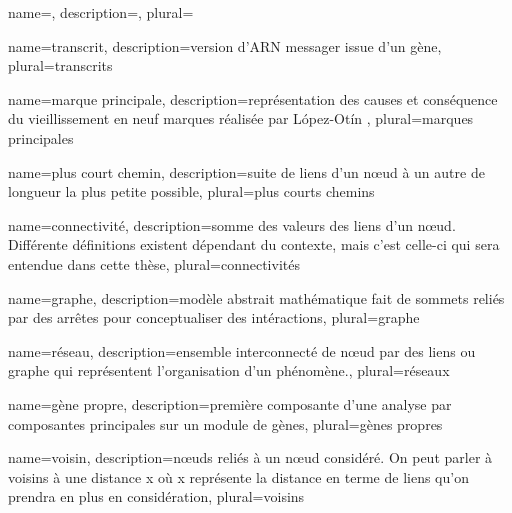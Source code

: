 
\printglossary[nonumberlist]
\glsaddall






\newglossaryentry{}
{
	name={},
	description={}, 
	plural={}
}

{
	name={transcrit},
	description={version d'ARN messager issue d'un gène}, 
	plural={transcrits}
}

{
	name={marque principale},
	description={représentation des causes et conséquence du vieillissement en neuf marques réalisée par López-Otín \cite{Lopez-Otin2013}}, 
	plural={marques principales}
}

{
	name={plus court chemin},
	description={suite de liens d'un nœud à un autre de longueur la plus petite possible}, 
	plural={plus courts chemins}
}

{
	name={connectivité},
	description={somme des valeurs des liens d'un nœud. Différente définitions existent dépendant du contexte, mais c'est celle-ci qui sera entendue dans cette thèse}, 
	plural={connectivités}
}

{
	name={graphe},
	description={modèle abstrait mathématique fait de sommets reliés par des arrêtes pour conceptualiser des intéractions}, 
	plural={graphe}
}

{
	name={réseau},
	description={ensemble interconnecté de nœud par des liens ou graphe qui représentent l'organisation d'un phénomène.}, 
	plural={réseaux}
}

{
	name={gène propre},
	description={première composante d'une analyse par composantes principales sur un module de gènes}, 
	plural={gènes propres}
}

{
	name={voisin},
	description={nœuds reliés à un nœud considéré. On peut parler à voisins à une distance x où x représente la distance en terme de liens qu'on prendra en plus en considération}, 
	plural={voisins}
}

